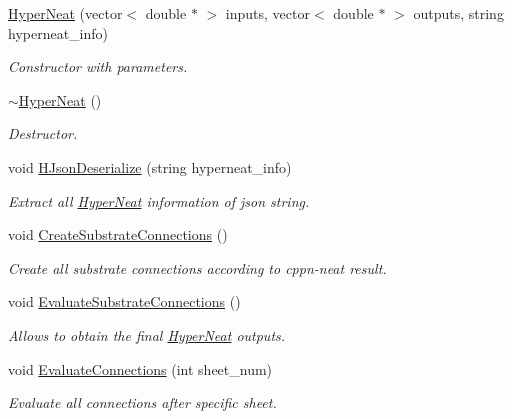 \begin{DoxyCompactItemize}
\item 
\hyperlink{class_a_n_n___u_s_m_1_1_hyper_neat_afa5ee92982d0a780e485341722a00286}{Hyper\-Neat} (vector$<$ double $\ast$ $>$ inputs, vector$<$ double $\ast$ $>$ outputs, string hyperneat\-\_\-info)
\begin{DoxyCompactList}\small\item\em Constructor with parameters. \end{DoxyCompactList}\item 
\hyperlink{class_a_n_n___u_s_m_1_1_hyper_neat_a1cd44e92cbfd6902977aad68ab7585ed}{$\sim$\-Hyper\-Neat} ()
\begin{DoxyCompactList}\small\item\em Destructor. \end{DoxyCompactList}\item 
void \hyperlink{class_a_n_n___u_s_m_1_1_hyper_neat_a67803bb6c5dc5986d9c44877d92587af}{H\-Json\-Deserialize} (string hyperneat\-\_\-info)
\begin{DoxyCompactList}\small\item\em Extract all \hyperlink{class_a_n_n___u_s_m_1_1_hyper_neat}{Hyper\-Neat} information of json string. \end{DoxyCompactList}\item 
void \hyperlink{class_a_n_n___u_s_m_1_1_hyper_neat_a0eb24949bc741c24f12bd812d519de8c}{Create\-Substrate\-Connections} ()
\begin{DoxyCompactList}\small\item\em Create all substrate connections according to cppn-\/neat result. \end{DoxyCompactList}\item 
void \hyperlink{class_a_n_n___u_s_m_1_1_hyper_neat_a593bcca0140041a340814b91d29a4a13}{Evaluate\-Substrate\-Connections} ()
\begin{DoxyCompactList}\small\item\em Allows to obtain the final \hyperlink{class_a_n_n___u_s_m_1_1_hyper_neat}{Hyper\-Neat} outputs. \end{DoxyCompactList}\item 
void \hyperlink{class_a_n_n___u_s_m_1_1_hyper_neat_aa2db8cfc0f567d330c07fbc209ad1bf2}{Evaluate\-Connections} (int sheet\-\_\-num)
\begin{DoxyCompactList}\small\item\em Evaluate all connections after specific sheet. \end{DoxyCompactList}\item 

\end{DoxyCompactItemize}

